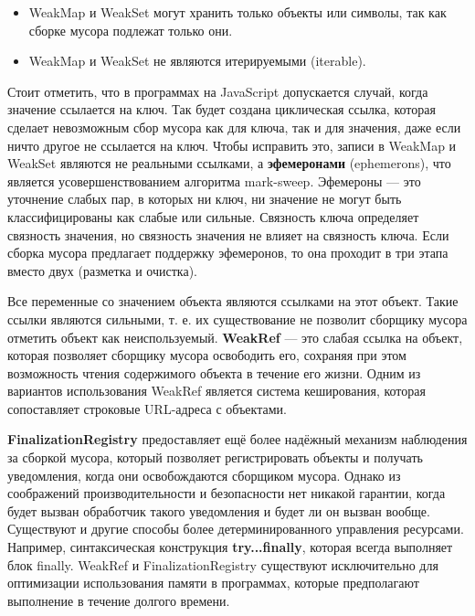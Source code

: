 \begin{itemize}[label*=---]
	\item WeakMap и WeakSet могут хранить только объекты или символы, так как сборке мусора подлежат только они.
	\item WeakMap и WeakSet не являются итерируемыми (iterable).
\end{itemize}

Стоит отметить, что в программах на JavaScript допускается случай, когда значение ссылается на ключ. Так будет создана циклическая ссылка, которая сделает невозможным сбор мусора как для ключа, так и для значения, даже если ничто другое не ссылается на ключ. Чтобы исправить это, записи в WeakMap и WeakSet являются не реальными ссылками, а \textbf{эфемеронами} (ephemerons), что является усовершенствованием алгоритма mark-sweep. Эфемероны \cite{js_ephemerons}--- это уточнение слабых пар, в которых ни ключ, ни значение не могут быть классифицированы как слабые или сильные. Связность ключа определяет связность значения, но связность значения не влияет на связность ключа. Если сборка мусора предлагает поддержку эфемеронов, то она проходит в три этапа вместо двух (разметка и очистка). \cite{js_memory}

Все переменные со значением объекта являются ссылками на этот объект. Такие ссылки являются сильными, т. е. их существование не позволит сборщику мусора отметить объект как неиспользуемый. \textbf{WeakRef} --- это слабая ссылка на объект, которая позволяет сборщику мусора освободить его, сохраняя при этом возможность чтения содержимого объекта в течение его жизни. Одним из вариантов использования WeakRef является система кеширования, которая сопоставляет строковые URL-адреса с объектами. \cite{js_memory}

\textbf{FinalizationRegistry} предоставляет ещё более надёжный механизм наблюдения за сборкой мусора, который позволяет регистрировать объекты и получать уведомления, когда они освобождаются сборщиком мусора. Однако из соображений производительности и безопасности нет никакой гарантии, когда будет вызван обработчик такого уведомления и будет ли он вызван вообще. Существуют и другие способы более детерминированного управления ресурсами. Например, синтаксическая конструкция \textbf{try...finally}, которая всегда выполняет блок finally. WeakRef и FinalizationRegistry существуют исключительно для оптимизации использования памяти в программах, которые предполагают выполнение в течение долгого времени. \cite{js_memory}

